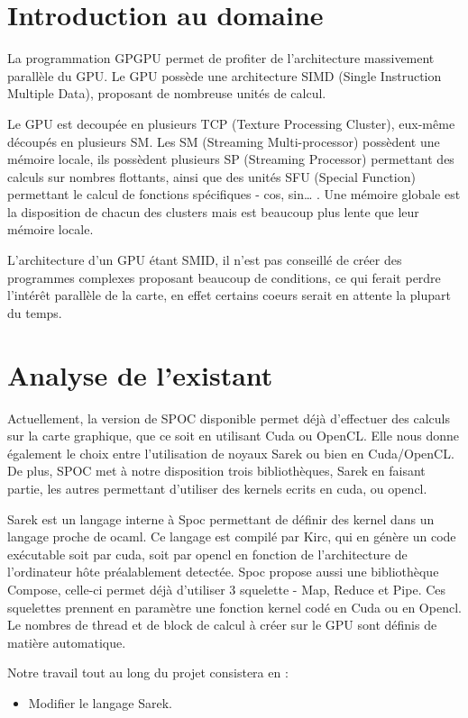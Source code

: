 \documentclass{report}
\begin{document}
\section{Introduction au domaine}
La programmation GPGPU permet de profiter de l’architecture massivement parallèle du GPU. Le GPU possède une architecture SIMD (Single Instruction Multiple Data), proposant de nombreuse unités de calcul. 

Le GPU est decoupée en plusieurs TCP (Texture Processing Cluster), eux-même découpés en plusieurs SM. Les SM (Streaming Multi-processor) possèdent une mémoire locale, ils possèdent plusieurs SP (Streaming Processor) permettant des calculs sur nombres flottants, ainsi que des unités SFU (Special Function) permettant le calcul de fonctions spécifiques - cos, sin… . Une mémoire globale est la disposition de chacun des clusters mais est beaucoup plus lente que leur mémoire locale.

L’architecture d’un GPU étant SMID, il n’est pas conseillé de créer des programmes complexes proposant beaucoup de conditions, ce qui ferait perdre l'intérêt parallèle de la carte, en effet certains coeurs serait en attente la plupart du temps. 

\section{Analyse de l'existant}
Actuellement, la version de SPOC disponible permet déjà d’effectuer des calculs sur la carte graphique, que ce soit en utilisant Cuda ou OpenCL. Elle nous donne également le choix entre l’utilisation de noyaux Sarek ou bien en Cuda/OpenCL. De plus, SPOC met à notre disposition trois bibliothèques, Sarek en faisant partie, les autres permettant d’utiliser des kernels ecrits en cuda, ou opencl.

Sarek est un langage interne à Spoc permettant de définir des kernel dans un langage proche de ocaml. Ce langage est compilé par Kirc, qui en génère un code exécutable soit par cuda, soit par opencl en fonction de l’architecture de l’ordinateur hôte préalablement detectée.
Spoc propose aussi une bibliothèque Compose, celle-ci permet déjà d’utiliser 3 squelette - Map, Reduce et Pipe. Ces squelettes prennent en paramètre une fonction kernel codé en Cuda ou en Opencl. Le nombres de thread et de block de calcul à créer sur le GPU sont définis de matière automatique. 
  
Notre travail tout au long du projet consistera en :
\begin{itemize}
\item Modifier le langage Sarek.
\end{itemize}
\end{document}
